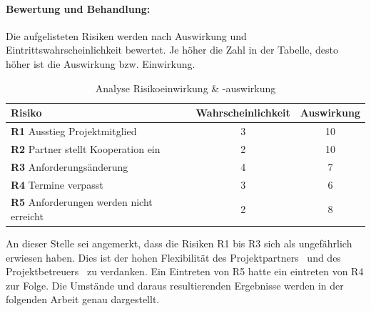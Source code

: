 \paragraph{Bewertung und Behandlung:}
Die aufgelisteten Risiken werden nach Auswirkung und Eintrittswahrscheinlichkeit bewertet.
Je höher die Zahl in der Tabelle, desto höher ist die Auswirkung bzw. Einwirkung.
\begin{table}[h]
	\begin{tabular}{l|c|c}
		\textbf{Risiko}                           & \multicolumn{1}{l|}{\textbf{Wahrscheinlichkeit}} & \multicolumn{1}{l}{\textbf{Auswirkung}} \\ \hline
		\textbf{R1} Ausstieg Projektmitglied                  & 3                                                & 10                                      \\
		\textbf{R2} Partner stellt Kooperation ein     & 2                                                & 10                                      \\
		\textbf{R3} Anforderungsänderung & 4                                                & 7                                       \\
		\textbf{R4} Termine verpasst   & 3                                                & 6                                       \\
		\textbf{R5} Anforderungen werden nicht erreicht       & 2                                                & 8                                      
	\end{tabular}
	\caption{Analyse Risikoeinwirkung \& -auswirkung}
	\label{Abb_Einwirkung_Auswirkung}
\end{table}

An dieser Stelle sei angemerkt, dass die Risiken R1 bis R3 sich als ungefährlich erwiesen haben. Dies ist der hohen Flexibilität des Projektpartners \getHammerl\ und des Projektbetreuers \getSteff\ zu verdanken. Ein Eintreten von R5 hatte ein eintreten von R4 zur Folge. Die Umstände und daraus resultierenden Ergebnisse werden in der folgenden Arbeit genau dargestellt.

\newpage

